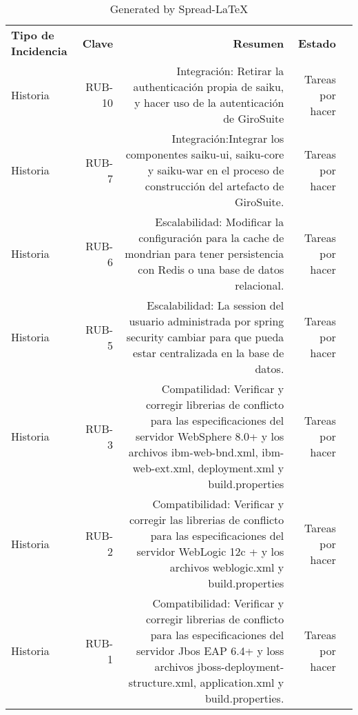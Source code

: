 	\begin{table}[!htp]\centering
		\caption{Generated by Spread-LaTeX}\label{tab: }
		\scriptsize
		\begin{tabular}{lrrrr}\toprule
			\cellcolor[HTML]{A8A8A8}\textbf{Tipo de Incidencia} &\cellcolor[HTML]{A8A8A8}\textbf{Clave} &\cellcolor[HTML]{A8A8A8}\textbf{Resumen} &\cellcolor[HTML]{A8A8A8}\textbf{Estado} \\\cmidrule{1-4}
			Historia &RUB-10 &Integración: Retirar la authenticación propia de saiku, y hacer uso de la autenticación de GiroSuite &Tareas por hacer \\\cmidrule{1-4}
			Historia &RUB-7 &Integración:Integrar los componentes saiku-ui, saiku-core y saiku-war en el proceso de construcción del artefacto de GiroSuite. &Tareas por hacer \\\cmidrule{1-4}
			Historia &RUB-6 &Escalabilidad: Modificar la configuración para la cache de mondrian para tener persistencia con Redis o una base de datos relacional. &Tareas por hacer \\\cmidrule{1-4}
			Historia &RUB-5 &Escalabilidad: La session del usuario administrada por spring security cambiar para que pueda estar centralizada en la base de datos. &Tareas por hacer \\\cmidrule{1-4}
			Historia &RUB-3 &Compatilidad: Verificar y corregir librerias de conflicto para las especificaciones del servidor WebSphere 8.0+ y los archivos ibm-web-bnd.xml, ibm-web-ext.xml, deployment.xml y build.properties &Tareas por hacer \\\cmidrule{1-4}
			Historia &RUB-2 &Compatibilidad: Verificar y corregir las librerias de conflicto para las especificaciones del servidor WebLogic 12c + y los archivos weblogic.xml y build.properties &Tareas por hacer \\\cmidrule{1-4}
			Historia &RUB-1 &Compatibilidad: Verificar y corregir librerias de conflicto para las especificaciones del servidor Jbos EAP 6.4+ y loss archivos jboss-deployment-structure.xml, application.xml y build.properties. &Tareas por hacer \\\midrule
			\bottomrule
		\end{tabular}
	\end{table}

